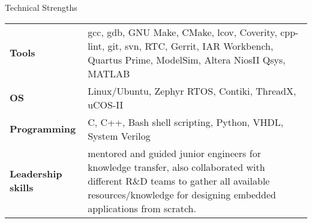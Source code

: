 \documentclass[
	a4paper, %
	11pt, %
]{resume} %
\begin{document}

\begin{rSection}{Technical Strengths}

	\begin{tabular}[t]{m{3cm} m{14cm}}
		\textbf{Tools} & gcc, gdb, GNU Make, CMake, lcov, Coverity, cpp-lint, git, svn, RTC, Gerrit, IAR
Workbench, Quartus Prime, ModelSim, Altera NiosII Qsys, MATLAB \\
            \textbf{OS} & Linux/Ubuntu, Zephyr RTOS, Contiki, ThreadX, uCOS-II \\
            \textbf{Programming} & C, C++, Bash shell scripting, Python, VHDL, System Verilog \\
		\textbf{Leadership skills} & mentored and guided junior engineers for knowledge transfer, also collaborated with different R\&D teams to gather all available resources/knowledge for designing embedded applications from scratch.

	\end{tabular}
 
\end{rSection}

\end{document}
